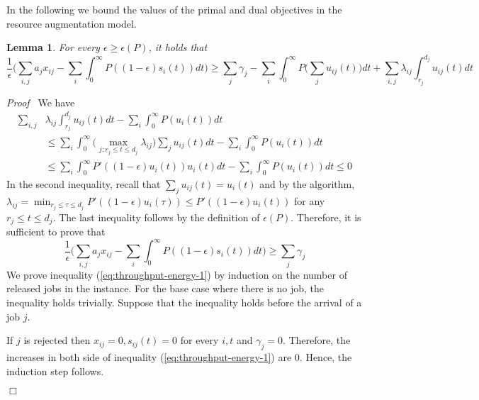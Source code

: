\documentclass[11pt]{article}
\newenvironment{proof}{\noindent\emph{Proof\ }}{\hspace*{\fill}$\Box$\medskip}
\newtheorem{lemma}{Lemma}
\begin{document}
In the following we bound the values of the primal and dual objectives 
in the resource augmentation model.

\begin{lemma}		\label{lem:throughput-energy}
For every $\epsilon \geq \epsilon(P)$, it holds that 
$$ 
\frac{1}{\epsilon} \biggl( \sum_{i,j} a_{j} x_{ij}  - \sum_{i}\int_{0}^{\infty} P((1-\epsilon)s_{i}(t))dt \biggl)
\geq \sum_{j} \gamma_{j} - \sum_{i} \int_{0}^{\infty} P\biggl(\sum_{j} u_{ij}(t) \biggl)dt 
+ \sum_{i,j} \lambda_{ij} \int_{r_{j}}^{d_{j}} u_{ij}(t)dt 
$$
\end{lemma}
\begin{proof}
We have 
\begin{align*}
\sum_{i,j} &\lambda_{ij} \int_{r_{j}}^{d_{j}} u_{ij}(t)dt - \sum_{i} \int_{0}^{\infty} P(u_{i}(t))dt \\
&\leq \sum_{i} \int_{0}^{\infty} \biggl( \max_{j: r_{j} \leq t \leq d_{j}} \lambda_{ij} \biggl) \sum_{j} u_{ij}(t)dt 
	- \sum_{i} \int_{0}^{\infty} P(u_{i}(t))dt \\
&\leq \sum_{i} \int_{0}^{\infty} P'((1-\epsilon)u_{i}(t)) u_{i}(t)dt 
	- \sum_{i} \int_{0}^{\infty} P(u_{i}(t))dt
\leq 0
\end{align*}
In the second inequality, recall that $\sum_{j} u_{ij}(t) = u_{i}(t)$
and by the algorithm, $\lambda_{ij} = \min_{r_{j} \leq \tau \leq d_{j}} P'((1-\epsilon)u_{i}(\tau)) \leq P'((1-\epsilon)u_{i}(t))$
for any $r_{j} \leq t \leq d_{j}$. 
The last inequality follows by the 
definition of $\epsilon(P)$. Therefore, it is sufficient to prove that 
\begin{equation}	\label{eq:throughput-energy-1}
\frac{1}{\epsilon} \biggl( \sum_{i,j} a_{j} x_{ij}  - \sum_{i}\int_{0}^{\infty} P((1-\epsilon)s_{i}(t))dt \biggl)
\geq \sum_{j} \gamma_{j}
\end{equation}
We prove inequality (\ref{eq:throughput-energy-1})
by induction on the number of released jobs in the instance. For the base case where there is 
no job, the inequality holds trivially. Suppose that the inequality holds before the arrival of a job $j$.

If $j$ is rejected then $x_{ij} = 0, s_{ij}(t) = 0$ for every $i,t$ and $\gamma_{j} = 0$. 
Therefore, the increases in both side of inequality (\ref{eq:throughput-energy-1}) are 0.
Hence, the induction step follows. 


\end{proof}
\end{document}
